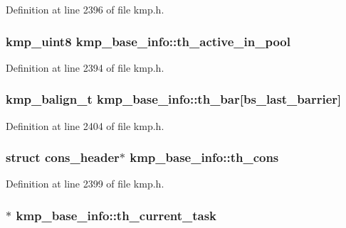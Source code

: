 Definition at line 2396 of file kmp.\-h.

\hypertarget{structkmp__base__info_a8314fc01deddcc18cab43aa4ba3098a6}{
\subsubsection[{th\-\_\-active\-\_\-in\-\_\-pool}]{\setlength{\rightskip}{0pt plus 5cm}kmp\-\_\-uint8 kmp\-\_\-base\-\_\-info\-::th\-\_\-active\-\_\-in\-\_\-pool}}\label{structkmp__base__info_a8314fc01deddcc18cab43aa4ba3098a6}


Definition at line 2394 of file kmp.\-h.

\hypertarget{structkmp__base__info_a11a3e7eb49becf1e6c63dbbf04b0d08e}{
\subsubsection[{th\-\_\-bar}]{ {\bf kmp\-\_\-balign\-\_\-t} kmp\-\_\-base\-\_\-info\-::th\-\_\-bar\mbox{[}{\bf bs\-\_\-last\-\_\-barrier}\mbox{]}}}\label{structkmp__base__info_a11a3e7eb49becf1e6c63dbbf04b0d08e}


Definition at line 2404 of file kmp.\-h.

\hypertarget{structkmp__base__info_a5a43bb0d55e068192da1397b326266ee}{
\subsubsection[{th\-\_\-cons}]{\setlength{\rightskip}{0pt plus 5cm}struct {\bf cons\-\_\-header}$\ast$ kmp\-\_\-base\-\_\-info\-::th\-\_\-cons}}\label{structkmp__base__info_a5a43bb0d55e068192da1397b326266ee}


Definition at line 2399 of file kmp.\-h.

\hypertarget{structkmp__base__info_a1c7bb182836b7c81e110ef3e9612c362}{
\subsubsection[{th\-\_\-current\-\_\-task}]{$\ast$ kmp\-\_\-base\-\_\-info\-::th\-\_\-current\-\_\-task}}\label{structkmp__base__info_a1c7bb182836b7c81e110ef3e9612c362}


